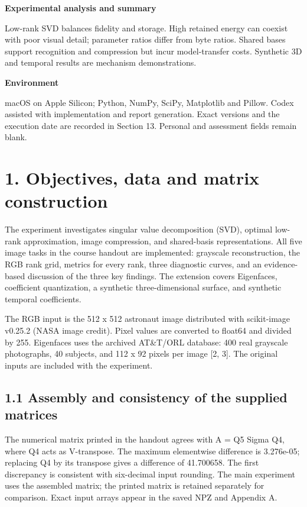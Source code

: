 \documentclass[a4paper,11pt]{article}
\begin{document}
\textbf{Experimental analysis and summary}

Low-rank SVD balances fidelity and storage. High retained energy can coexist with poor visual detail; parameter ratios differ from byte ratios. Shared bases support recognition and compression but incur model-transfer costs. Synthetic 3D and temporal results are mechanism demonstrations.

\textbf{Environment}

macOS on Apple Silicon; Python, NumPy, SciPy, Matplotlib and Pillow. Codex assisted with implementation and report generation. Exact versions and the execution date are recorded in Section 13. Personal and assessment fields remain blank.

\clearpage
\section*{1. Objectives, data and matrix construction}
The experiment investigates singular value decomposition (SVD), optimal low-rank approximation, image compression, and shared-basis representations. All five image tasks in the course handout are implemented: grayscale reconstruction, the RGB rank grid, metrics for every rank, three diagnostic curves, and an evidence-based discussion of the three key findings. The extension covers Eigenfaces, coefficient quantization, a synthetic three-dimensional surface, and synthetic temporal coefficients.

The RGB input is the 512 x 512 astronaut image distributed with scikit-image v0.25.2 (NASA image credit). Pixel values are converted to float64 and divided by 255. Eigenfaces uses the archived AT\&T/ORL database: 400 real grayscale photographs, 40 subjects, and 112 x 92 pixels per image [2, 3]. The original inputs are included with the experiment.

\subsection*{1.1 Assembly and consistency of the supplied matrices}
The numerical matrix printed in the handout agrees with A = Q5 Sigma Q4, where Q4 acts as V-transpose. The maximum elementwise difference is 3.276e-05; replacing Q4 by its transpose gives a difference of 41.700658. The first discrepancy is consistent with six-decimal input rounding. The main experiment uses the assembled matrix; the printed matrix is retained separately for comparison. Exact input arrays appear in the saved NPZ and Appendix A.
\end{document}
